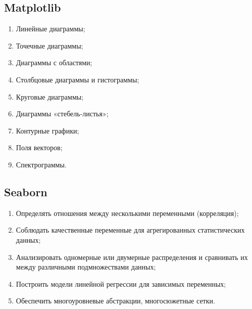 \subsection*{Matplotlib}

\begin{enumerate}
	\item Линейные диаграммы;
	\item Точечные диаграммы;
	\item Диаграммы с областями;
	\item Столбцовые диаграммы и гистограммы;
	\item Круговые диаграммы;
	\item Диаграммы «стебель-листья»;
	\item Контурные графики;
	\item Поля векторов;
	\item Спектрограммы.
\end{enumerate}

\subsection*{Seaborn}

\begin{enumerate}
	\item Определять отношения между несколькими переменными (корреляция);
	\item Соблюдать качественные переменные для агрегированных статистических данных;
	\item Анализировать одномерные или двумерные распределения и сравнивать их между различными подмножествами данных;
	\item Построить модели линейной регрессии для зависимых переменных;	
	\item Обеспечить многоуровневые абстракции, многосюжетные сетки.
\end{enumerate}